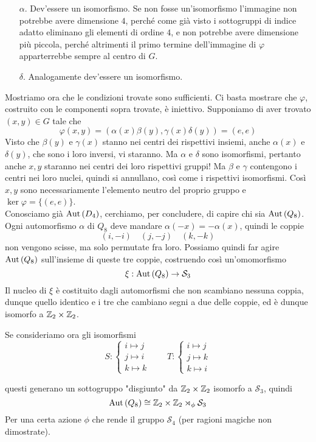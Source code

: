 \begin{multicols}{2}
\begin{itemize}
	 \item [$ \alpha $.] Dev'essere un isomorfismo. Se non fosse un'isomorfismo l'immagine non potrebbe avere dimensione $ 4 $, perché come già visto i sottogruppi di indice adatto eliminano gli elementi di ordine $ 4 $, e non potrebbe avere dimensione più piccola, perché altrimenti il primo termine dell'immagine di $ \varphi $ apparterrebbe sempre al centro di $ G $.
	 
	 \item [$ \delta $.] Analogamente dev'essere un isomorfismo. 
	\end{itemize}
Mostriamo ora che le condizioni trovate sono sufficienti. Ci basta mostrare che $ \varphi $, costruito con le componenti sopra trovate, è iniettivo. Supponiamo di aver trovato $ (x, y) \in G $ tale che
\[ \varphi(x, y) = (\alpha(x)\beta(y), \gamma(x)\delta(y)) = (e, e) \]
Visto che $ \beta(y) $ e $ \gamma(x) $ stanno nei centri dei rispettivi insiemi, anche $ \alpha(x) $ e $ \delta(y) $, che sono i loro inversi, vi staranno. Ma $ \alpha $ e $ \delta $ sono isomorfismi, pertanto anche $ x, y $ staranno nei centri dei loro rispettivi gruppi! Ma $ \beta $ e $ \gamma $ contengono i centri nei loro nuclei, quindi si annullano, così come i rispettivi isomorfismi. Così $ x, y $ sono necessariamente l'elemento neutro del proprio gruppo e $ \ker\varphi = \{(e, e)\} $. \\

Conosciamo già $ \mathrm{Aut}\left( D_4 \right) $, cerchiamo, per concludere, di capire chi sia{\tiny } $ \mathrm{Aut}\left( Q_8 \right) $. \\

Ogni automorfismo $ \alpha $ di $ Q_8 $ deve mandare $ \alpha(-x) = -\alpha(x) $, quindi le coppie 
\[ (i, -i) \quad (j, -j) \quad (k, -k) \]
non vengono scisse, ma solo permutate fra loro. Possiamo quindi far agire $ \mathrm{Aut}\left( Q_8 \right) $ sull'insieme di queste tre coppie, costruendo così un'omomorfismo
\[ \xi : \mathrm{Aut}\left( Q_8 \right) \to \mathcal{S}_3 \]
Il nucleo di $ \xi $ è costituito dagli automorfismi che non scambiano nessuna coppia, dunque quello identico e i tre che cambiano segni a due delle coppie, ed è dunque isomorfo a $ \mathbb{Z}_2 \times \mathbb{Z}_2 $.

Se consideriamo ora gli isomorfismi
\[ S: \begin{cases}
i \mapsto j \\ j \mapsto i \\ k \mapsto k
\end{cases}
\qquad T: \begin{cases}
i \mapsto j\\
j \mapsto k\\
k \mapsto i
\end{cases} \]


questi generano un sottogruppo "disgiunto" da $ \mathbb{Z}_2 \times \mathbb{Z}_2 $ isomorfo a $ \mathcal{S}_3 $, quindi
\[ \mathrm{Aut}\left( Q_8 \right) \cong \mathbb{Z}_2 \times \mathbb{Z}_2 \rtimes_\phi \mathcal{S}_3 \] Per una certa azione $ \phi $ che rende il gruppo $ \mathcal{S}_4 $ (per ragioni magiche non dimostrate).




\end{multicols}


